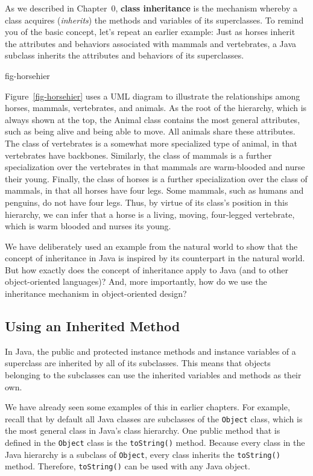 As we described in Chapter~0, {\bf class inheritance} is the mechanism
whereby a class acquires ({\em inherits}) the methods and variables of
its superclasses.  To remind you of the basic concept, let's repeat an
earlier example: Just as horses inherit the attributes and behaviors
associated with mammals and vertebrates, a Java subclass inherits the
attributes and behaviors of its superclasses.

{fig-horsehier}

Figure~\ref{fig-horsehier} uses a UML diagram to illustrate the relationships among
horses, mammals, vertebrates, and animals. As the root of the
hierarchy, which is always shown at the top, the Animal class contains
the most general attributes, such as being alive and being able to
move. All animals share these attributes. The class of vertebrates is
a somewhat more specialized type of animal, in that vertebrates have
backbones. Similarly, the class of mammals is a further specialization
over the vertebrates in that mammals are warm-blooded and nurse their
young.  Finally, the class of horses is a further specialization over
the class of mammals, in that all horses have four legs. Some mammals,
such as humans and penguins, do not have four legs.  Thus, by virtue
of its class's position in this hierarchy, we can infer that a horse
is a living, moving, four-legged vertebrate, which is warm blooded and
nurses its young.

We have deliberately used an example from the natural world to show
that the concept of inheritance in Java is inspired by its counterpart
in the natural world.  But how exactly does the concept of inheritance
apply to Java (and to other object-oriented languages)? And, more
importantly, how do we use the inheritance mechanism in
object-oriented design?

\subsection{Using an Inherited Method}

In Java, the public and protected instance methods and instance
variables of a superclass are inherited by all of its subclasses.
This means that objects belonging to the subclasses can use the
inherited variables and methods as their own.

We have already seen some examples of this in earlier chapters. For
example, recall that by default all Java classes are subclasses of the
{\tt Object} class, which is the most general class in Java's class hierarchy.
One public method that is defined in the {\tt Object} class is the
{\tt toString()} method.  Because every class in the Java hierarchy is
a subclass of {\tt Object}, every class inherits the {\tt toString()}
method.  Therefore, {\tt toString()} can be used with any Java object.

